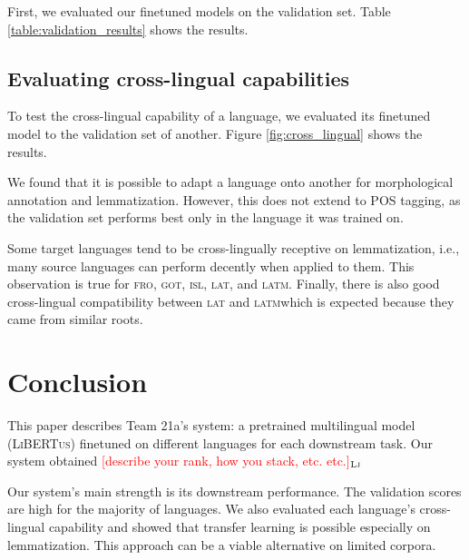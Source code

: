 \documentclass[11pt]{article}
\newcommand{\draftonly}[1]{#1}
\newcommand{\draftcomment}[3]{\draftonly{\textcolor{#2}{[#3]{$_{\textsc{#1}}$}}}}
\newcommand{\lj}[1]{\draftcomment{Lj}{red}{#1}}
\newcommand{\libertus}{\textsc{LiBERTus}}
\begin{document}


First, we evaluated our finetuned models on the validation set.
Table \ref{table:validation_results} shows the results.

\subsection{Evaluating cross-lingual capabilities}
\label{sec:results_crosslingual}

To test the cross-lingual capability of a language, we evaluated its finetuned model to the validation set of another.
Figure \ref{fig:cross_lingual} shows the results.

We found that it is possible to adapt a language onto another for morphological annotation and lemmatization.
However, this does not extend to POS tagging, as the validation set performs best only in the language it was trained on.

Some target languages tend to be cross-lingually receptive on lemmatization, i.e., many source languages can perform decently when applied to them.
This observation is true for \textsc{fro}, \textsc{got}, \textsc{isl}, \textsc{lat}, and \textsc{latm}.
Finally, there is also good cross-lingual compatibility between \textsc{lat} and \textsc{latm}\textemdash which is expected because they came from similar roots. 

\section{Conclusion}

This paper describes Team 21a's system: a pretrained multilingual model (\libertus{}) finetuned on different languages for each downstream task.
Our system obtained \lj{describe your rank, how you stack, etc. etc.}

Our system's main strength is its downstream performance.
The validation scores are high for the majority of languages.
We also evaluated each language's cross-lingual capability and showed that transfer learning is possible especially on lemmatization.
This approach can be a viable alternative on limited corpora.
\end{document}
